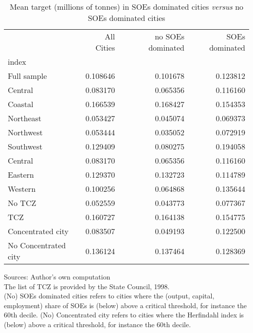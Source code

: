 \documentclass[12pt]{article}
\begin{document}
\begin{table}[!htb] \centering
\caption{\\ Mean target (millions of tonnes) in SOEs dominated cities \textit{versus} no SOEs dominated cities}
\label{table_4}
\begin{adjustbox}{width=\textwidth, totalheight=\baselineskip,keepaspectratio}
\begin{tabular}{lrrr}
\toprule
{} & All Cities & no SOEs dominated & SOEs dominated \\
index                &            &                  &               \\
\midrule
Full sample          &   0.108646 &         0.101678 &      0.123812 \\
Central              &   0.083170 &         0.065356 &      0.116160 \\
Coastal              &   0.166539 &         0.168427 &      0.154353 \\
Northeast            &   0.053427 &         0.045074 &      0.069373 \\
Northwest            &   0.053444 &         0.035052 &      0.072919 \\
Southwest            &   0.129409 &         0.080275 &      0.194058 \\
Central              &   0.083170 &         0.065356 &      0.116160 \\
Eastern              &   0.129370 &         0.132723 &      0.114789 \\
Western              &   0.100256 &         0.064868 &      0.135644 \\
No TCZ               &   0.052559 &         0.043773 &      0.077367 \\
TCZ                  &   0.160727 &         0.164138 &      0.154775 \\
Concentrated city    &   0.083507 &         0.049193 &      0.122500 \\
No Concentrated city &   0.136124 &         0.137464 &      0.128369 \\
\bottomrule
\end{tabular}
\end{adjustbox}
\begin{tablenotes} 
 \small 
 \item 
Sources: Author's own computation \\
The list of TCZ is provided by the State Council, 1998. \\
(No) SOEs dominated cities refers to cities where the 
(output, capital, employment) share of SOEs is (below) above a critical threshold, for instance the 60th decile. (No) Concentrated city refers to cities where the Herfindahl index is (below) above a critical threshold, for instance the 60th decile.
\end{tablenotes}
\end{table}
\end{document}
